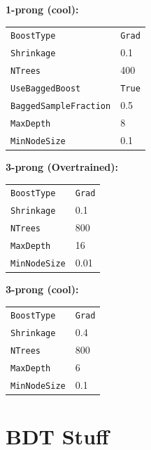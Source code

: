\vfill

\noindent\textbf{1-prong (cool):}\\[0.3em]
\begin{tabular}{ll}
  \texttt{BoostType} & \texttt{Grad} \\
  \texttt{Shrinkage} & 0.1 \\
  \texttt{NTrees} & 400 \\
  \texttt{UseBaggedBoost} & \texttt{True} \\
  \texttt{BaggedSampleFraction} & 0.5 \\
  \texttt{MaxDepth} & 8 \\
  \texttt{MinNodeSize} & 0.1 \\
\end{tabular}

\vfill

\noindent\textbf{3-prong (Overtrained):}\\[0.3em]
\begin{tabular}{ll}
  \texttt{BoostType} & \texttt{Grad} \\
  \texttt{Shrinkage} & 0.1 \\
  \texttt{NTrees} & 800 \\
  \texttt{MaxDepth} & 16 \\
  \texttt{MinNodeSize} & 0.01 \\
\end{tabular}

\vfill

\noindent\textbf{3-prong (cool):}\\[0.3em]
\begin{tabular}{ll}
  \texttt{BoostType} & \texttt{Grad} \\
  \texttt{Shrinkage} & 0.4 \\
  \texttt{NTrees} & 800 \\
  \texttt{MaxDepth} & 6 \\
  \texttt{MinNodeSize} & 0.1 \\
\end{tabular}

\clearpage
\section{BDT Stuff}
\label{app:bdt_stuff}

